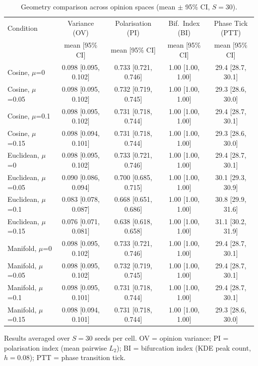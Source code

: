 \begin{table}[t]
  \centering
  \caption{Geometry comparison across opinion spaces (mean $\pm$ 95\% CI, $S=30$).}
  \label{tab:geometry}
  \begin{tabular}{lcccc}
    \toprule
    Condition & Variance (OV) & Polarisation (PI) & Bif.\ Index (BI) & Phase Tick (PTT) \\
    & mean [95\% CI] & mean [95\% CI] & mean [95\% CI] & mean [95\% CI] \\
    \midrule
    Cosine, $\mu$=0 & 0.098 [0.095, 0.102] & 0.733 [0.721, 0.746] & 1.00 [1.00, 1.00] & 29.4 [28.7, 30.1] \\
    Cosine, $\mu$=0.05 & 0.098 [0.095, 0.102] & 0.732 [0.719, 0.745] & 1.00 [1.00, 1.00] & 29.3 [28.6, 30.0] \\
    Cosine, $\mu$=0.1 & 0.098 [0.095, 0.102] & 0.731 [0.718, 0.744] & 1.00 [1.00, 1.00] & 29.4 [28.7, 30.1] \\
    Cosine, $\mu$=0.15 & 0.098 [0.094, 0.101] & 0.731 [0.718, 0.744] & 1.00 [1.00, 1.00] & 29.3 [28.6, 30.0] \\
    \midrule
    Euclidean, $\mu$=0 & 0.098 [0.095, 0.102] & 0.733 [0.721, 0.746] & 1.00 [1.00, 1.00] & 29.4 [28.7, 30.1] \\
    Euclidean, $\mu$=0.05 & 0.090 [0.086, 0.094] & 0.700 [0.685, 0.715] & 1.00 [1.00, 1.00] & 30.1 [29.3, 30.9] \\
    Euclidean, $\mu$=0.1 & 0.083 [0.078, 0.087] & 0.668 [0.651, 0.686] & 1.00 [1.00, 1.00] & 30.8 [29.9, 31.6] \\
    Euclidean, $\mu$=0.15 & 0.076 [0.071, 0.081] & 0.638 [0.618, 0.658] & 1.00 [1.00, 1.00] & 31.1 [30.2, 31.9] \\
    \midrule
    Manifold, $\mu$=0 & 0.098 [0.095, 0.102] & 0.733 [0.721, 0.746] & 1.00 [1.00, 1.00] & 29.4 [28.7, 30.1] \\
    Manifold, $\mu$=0.05 & 0.098 [0.095, 0.102] & 0.732 [0.719, 0.745] & 1.00 [1.00, 1.00] & 29.4 [28.7, 30.1] \\
    Manifold, $\mu$=0.1 & 0.098 [0.095, 0.101] & 0.731 [0.718, 0.744] & 1.00 [1.00, 1.00] & 29.4 [28.7, 30.1] \\
    Manifold, $\mu$=0.15 & 0.098 [0.094, 0.101] & 0.731 [0.718, 0.744] & 1.00 [1.00, 1.00] & 29.3 [28.6, 30.0] \\
    \bottomrule
  \end{tabular}
  \begin{minipage}{\linewidth}
    \vspace{4pt}
    \footnotesize Results averaged over $S=30$ seeds per cell. OV = opinion variance; PI = polarisation index (mean pairwise $L_2$); BI = bifurcation index (KDE peak count, $h=0.08$); PTT = phase transition tick.
  \end{minipage}
\end{table}